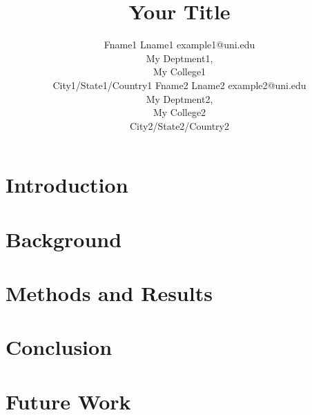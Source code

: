 \documentclass[11pt]{article}
\begin{document}
\title{Your Title}

\author{\name Fname1 Lname1 \email example1@uni.edu \\
       \addr My Deptment1,\\
       My College1\\
       City1/State1/Country1
       \AND
       \name Fname2 Lname2 \email example2@uni.edu \\
       \addr My Deptment2,\\
       My College2\\
       City2/State2/Country2
       }

\maketitle


\begin{abstract}

\end{abstract}

\section{Introduction}
\label{sec:Introduction}


\section{Background}
\label{sec:Background}


\section{Methods and Results}
\label{sec:Methods}


\section{Conclusion}
\label{sec:Conclusion}


\section{Future Work}
\label{sec:FutureWork}

\acks{}

\nocite{tanis}
\nocite{casella}


\end{document}
